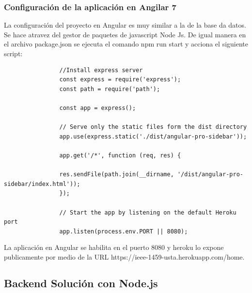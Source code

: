         \subsubsection{Configuración de la aplicación en Angilar 7}

            La configuración del proyecto en Angular es muy similar a la de la base da datos. Se hace atravez del gestor de paquetes de javascript Node Js. De igual manera en el archivo package.json se ejecuta el comando npm run start y acciona el siguiente script:

            \begin{lstlisting}
                //Install express server
                const express = require('express');
                const path = require('path');
            
                const app = express();
            
                // Serve only the static files form the dist directory
                app.use(express.static('./dist/angular-pro-sidebar'));
            
                app.get('/*', function (req, res) {
            
                res.sendFile(path.join(__dirname, '/dist/angular-pro-sidebar/index.html'));
                });
            
                // Start the app by listening on the default Heroku port
                app.listen(process.env.PORT || 8080);
            \end{lstlisting}

            La aplicación en Angular se habilita en el puerto 8080 y heroku lo expone publicamente por medio de la URL https://ieee-1459-usta.herokuapp.com/home.
    
    \subsection{Backend Solución con Node.js}

        

